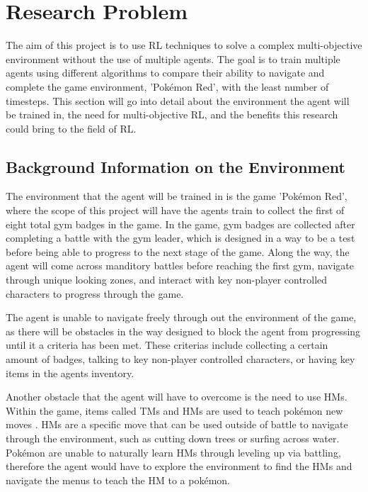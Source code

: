 \section{Research Problem}

The aim of this project is to use RL techniques to solve a complex multi-objective environment without the use of multiple agents. The goal is to train multiple agents using different algorithms to compare their ability to navigate and complete the game environment, 'Pokémon Red', with the least number of timesteps. This section will go into detail about the environment the agent will be trained in, the need for multi-objective RL, and the benefits this research could bring to the field of RL.

\subsection{Background Information on the Environment}

The environment that the agent will be trained in is the game 'Pokémon Red', where the scope of this project will have the agents train to collect the first of eight total gym badges in the game. In the game, gym badges are collected after completing a battle with the gym leader, which is designed in a way to be a test before being able to progress to the next stage of the game. Along the way, the agent will come across manditory battles before reaching the first gym, navigate through unique looking zones, and interact with key non-player controlled characters to progress through the game. 

The agent is unable to navigate freely through out the environment of the game, as there will be obstacles in the way designed to block the agent from progressing until it a criteria has been met. These criterias include collecting a certain amount of badges, talking to key non-player controlled characters, or having key items in the agents inventory.  

Another obstacle that the agent will have to overcome is the need to use HMs. Within the game, items called TMs and HMs are used to teach pokémon new moves \cite{SerebiiTeam2016}. HMs are a specific move that can be used outside of battle to navigate through the environment, such as cutting down trees or surfing across water. Pokémon are unable to naturally learn HMs through leveling up via battling, therefore the agent would have to explore the environment to find the HMs and navigate the menus to teach the HM to a pokémon.

